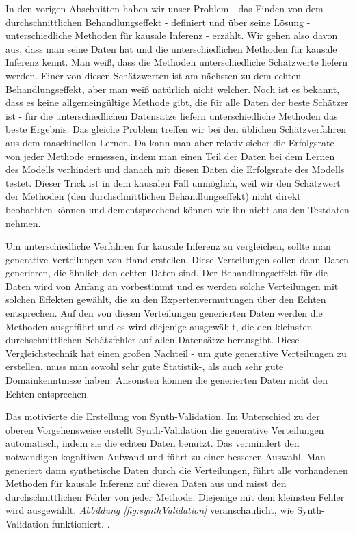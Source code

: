 \documentclass[12pt,a4paper,twoside]{scrartcl}
\numberwithin{equation}{section}
\newcommand{\reffig}[1]{\emph{\hyperref[#1]{Abbildung \ref*{#1}}}}
\begin{document}
In den vorigen Abschnitten haben wir unser Problem - das Finden von dem durchschnittlichen Behandlungseffekt - definiert und über seine Lösung - unterschiedliche Methoden für kausale Inferenz - erzählt. Wir gehen also davon aus, dass man seine Daten hat und die unterschiedlichen Methoden für kausale Inferenz kennt. Man weiß, dass die Methoden unterschiedliche Schätzwerte liefern werden. Einer von diesen Schätzwerten ist am nächsten zu dem echten Behandlungseffekt, aber man weiß natürlich nicht welcher. Noch ist es bekannt, dass es keine allgemeingültige Methode gibt, die für alle Daten der beste Schätzer ist - für die unterschiedlichen Datensätze liefern unterschiedliche Methoden das beste Ergebnis. Das gleiche Problem treffen wir bei den üblichen Schätzverfahren aus dem maschinellen Lernen. Da kann man aber relativ sicher die Erfolgsrate von  jeder Methode ermessen, indem man einen Teil der Daten bei dem Lernen des Modells verhindert und danach mit diesen Daten die Erfolgsrate des Modells testet. Dieser Trick ist in dem kausalen Fall unmöglich, weil wir den Schätzwert der Methoden (den durchschnittlichen Behandlungseffekt) nicht direkt beobachten können und dementsprechend können wir ihn nicht aus den Testdaten nehmen\cite{schuler2017synth}.\par

\noindent
Um unterschiedliche Verfahren für kausale Inferenz zu vergleichen, sollte man generative Verteilungen von Hand erstellen. Diese Verteilungen sollen dann Daten generieren, die ähnlich den echten Daten sind. Der Behandlungseffekt für die Daten wird von Anfang an vorbestimmt und es werden solche Verteilungen mit solchen Effekten gewählt, die zu den Expertenvermutungen über den Echten entsprechen. Auf den von diesen Verteilungen generierten Daten werden die Methoden ausgeführt und es wird diejenige ausgewählt, die den kleinsten durchschnittlichen Schätzfehler auf  allen Datensätze herausgibt. Diese Vergleichstechnik hat einen großen Nachteil - um gute generative Verteilungen zu erstellen, muss man sowohl sehr gute Statistik-, als auch sehr gute Domainkenntnisse haben. Ansonsten können die generierten Daten nicht den Echten entsprechen\cite{schuler2017synth}.\par 

\noindent
Das motivierte die Erstellung von Synth-Validation. Im Unterschied zu der oberen Vorgehensweise erstellt Synth-Validation die generative Verteilungen automatisch, indem sie die echten Daten benutzt. Das vermindert den notwendigen kognitiven Aufwand und führt zu einer besseren Auswahl. Man generiert dann synthetische Daten durch die Verteilungen, führt alle vorhandenen Methoden für kausale Inferenz auf diesen Daten aus und misst den durchschnittlichen Fehler von jeder Methode. Diejenige mit dem kleinsten Fehler wird ausgewählt. \reffig{fig:synthValidation} veranschaulicht, wie Synth-Validation funktioniert. \cite{schuler2017synth}.\par 
\end{document}
